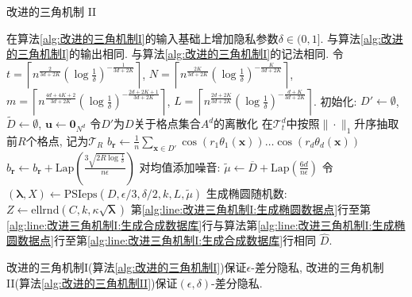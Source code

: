 \begin{algorithm}[hbtp]
\caption{改进的三角机制 II}\label{alg:改进的三角机制II}
\begin{algorithmic}[1]
  \REQUIRE 在算法\ref{alg:改进的三角机制I}的输入基础上增加隐私参数$\delta\in(0, 1]$.
  \ENSURE 与算法\ref{alg:改进的三角机制I}的输出相同.
  \NOTATION 与算法\ref{alg:改进的三角机制I}的记法相同.
  \STATE 令 $t = \left\lceil n^{\frac{2}{3d+2K}}(\log\frac{1}{\delta}) ^{-\frac{1}{3d+2K}} \right\rceil$,
   $N = \left\lceil n^{\frac{2K}{3d+2K}}(\log\frac{1}{\delta}) ^{-\frac{K}{3d+2K}}\right\rceil$, \\ 
   $m = \left\lceil n^{\frac{4d+4K+2}{3d+2K}}(\log\frac{1}{\delta}) ^{-\frac{2d+2K+1}{3d+2K}}\right\rceil$,
   $L=\left\lceil n^{\frac{2d+2K}{3d+2K}}(\log\frac{1}{\delta}) ^{-\frac{d+K}{3d+2K}}\right\rceil$. \label{alg:line:改进三角机制II:参数设定}
   \STATE 初始化: $D' \leftarrow \emptyset$, $\tilde{D} \leftarrow \emptyset$, $\mathbf{u} \leftarrow \mathbf{0}_{N^d}$ \label{alg:line:改进三角机制II:初始化}
   \STATE 令$D'$为$D$关于格点集合$A^d$的离散化
   \STATE 在$\mathcal{T}_t^d$中按照$\|\cdot\|_1$升序抽取前$R$个格点, 记为$\mathcal{T}_R$
     \STATE $b_{\mathbf{r}} \leftarrow \frac{1}{n} \sum_{\mathbf{x}\in D'}\cos\left(r_1 \theta_1(\mathbf{x}) \right)\ldots \cos \left(r_d \theta_d(\mathbf{x}) \right)$ \label{alg:line:改进三角机制II:计算原始数据查询基结果}
     \STATE $\hat{b}_{\mathbf{r}} \leftarrow b_{\mathbf{r}} + \mathrm{Lap}\left(\frac{3\sqrt{2R\log\frac{1}{\delta}}}{n \epsilon}\right)$
      \label{alg:line:改进三角机制II:LP编码离散化b}
   \ENDFOR
   \STATE 对均值添加噪音: $\tilde{\mu} \leftarrow \overline{D} + \mathrm{Lap}\left(\frac{6d}{n\epsilon}\right)$
   \STATE 令$(\boldsymbol{\lambda}, X) \leftarrow \mathrm{PSIeps}\left(D, \epsilon/3, \delta/2, k, L, \tilde{\mu}\right)$
   \STATE 生成椭圆随机数: $Z \leftarrow \mathrm{ellrnd}\left(C, k, \kappa\sqrt{\boldsymbol{\lambda}}\right)$
   \STATE 第\ref{alg:line:改进三角机制I:生成椭圆数据点}行至第\ref{alg:line:改进三角机制I:生成合成数据库}行与算法第\ref{alg:line:改进三角机制I:生成椭圆数据点}行至第\ref{alg:line:改进三角机制I:生成合成数据库}行相同
  \RETURN $\hat{D}$.
\end{algorithmic}
\end{algorithm}
\begin{thm}[改进三角机制的隐私性]\label{thm:改进三角机制的隐私性}
  改进的三角机制I(算法\ref{alg:改进的三角机制I})保证$\epsilon$-差分隐私, 改进的三角机制II(算法\ref{alg:改进的三角机制II})保证$(\epsilon, \delta)$-差分隐私.
\end{thm}
